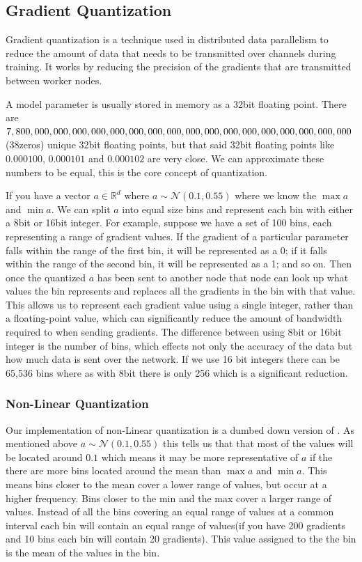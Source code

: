 \documentclass[11pt]{article}
\begin{document}
\subsection{Gradient Quantization}
Gradient quantization is a technique used in distributed data parallelism to reduce the amount of data that needs to be transmitted over channels during training. It works by reducing the precision of the gradients that are transmitted between worker nodes.

A model parameter is usually stored in memory as a 32bit floating point. There are $7, 800, 000, 000,\\ 000, 000,000,000,000,000,000,000,000,000,000,000,000,000,000$(38zeros) unique 32bit floating points, but that said 32bit floating points like $0.000100$, $0.000101$ and $0.000102$ are very close. We can approximate these numbers to be equal, this is the core concept of quantization.

If you have a vector $a \in \mathbb{R}^d$ where $a \sim \mathcal{N}(0.1,0.55)$ where we know the $\max a$ and $\min a$. We can split $a$ into equal size bins and represent each bin with either a 8bit or 16bit integer. For example, suppose we have a set of 100 bins, each representing a range of gradient values. If the gradient of a particular parameter falls within the range of the first bin, it will be represented as a 0; if it falls within the range of the second bin, it will be represented as a 1; and so on. Then once the quantized $a$ has been sent to another node that node can look up what values the bin represents and replaces all the gradients in the bin with that value. This allows us to represent each gradient value using a single integer, rather than a floating-point value, which can significantly reduce the amount of bandwidth required to when sending gradients. The difference between using 8bit or 16bit integer is the number of bins, which effects not only the accuracy of the data but how much data is sent over the network. If we use 16 bit integers there can be 65,536 bins where as with 8bit there is only 256 which is a significant reduction.

\subsubsection{Non-Linear Quantization}

Our implementation of non-Linear quantization is a dumbed down version of \cite{dettmers20218}. As mentioned above $a \sim \mathcal{N}(0.1,0.55)$ this tells us that that most of the values will be located around $0.1$ which means it may be more representative of $a$ if the there are more bins located around the mean than $\max a$ and $\min a$. This means bins closer to the mean cover a lower range of values, but occur at a higher frequency. Bins closer to the min and the max cover a larger range of values. Instead of all the bins covering an equal range of values at a common interval each bin will contain an equal range of values(if you have 200 gradients and 10 bins each bin will contain 20 gradients). This value assigned to the the bin is the mean of the values in the bin.
\end{document}

